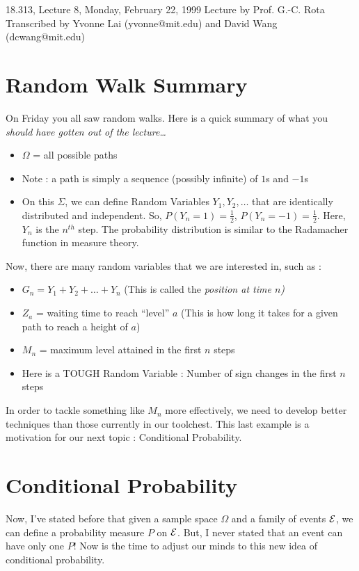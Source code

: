 {\Large 18.313, Lecture 8, Monday, February 22, 1999}\newline
{\large Lecture by Prof. G.-C. Rota}\\
Transcribed by Yvonne Lai (yvonne@mit.edu) and David Wang (dcwang@mit.edu)\\

\section{Random Walk Summary}
On Friday you all saw random walks.  Here is a quick summary of what you \em should \em have gotten out of the lecture\ldots
\begin{itemize}
\item[] $\Omega$ = all possible paths
\item[] Note : a path is simply a sequence (possibly infinite) of $1$s and $-1$s
\item[] On this $\Sigma$, we can define Random Variables $Y_1, Y_2, \ldots$ that are identically distributed and independent.  So, $P(Y_n = 1) = \frac{1}{2}$, $P(Y_n = -1) = \frac{1}{2}$.  Here, $Y_n$ is the $n^{th}$ step.  The probability distribution is similar to the Radamacher function in measure theory.
\end{itemize}
Now, there are many random variables that we are interested in, such as : 
\begin{itemize}
\item $G_n = Y_1 + Y_2 + \ldots + Y_n$ (This is called the \em position \em at time $n$)
\item $ Z_a$ = waiting time to reach ``level'' $a$ (This is how long it takes for a given path to reach a height of $a$)
\item $M_n$ = maximum level attained in the first $n$ steps
\item[] Here is a TOUGH Random Variable : Number of sign changes in the first $n$ steps
\end{itemize}
In order to tackle something like $M_n$ more effectively, we need to develop better techniques than those currently in our toolchest.  This last example is a motivation for our next topic : Conditional Probability.

\section{Conditional Probability}
Now, I've stated before that given a sample space $\Omega$ and a family of events $\cal{E}$, we can define a probability measure $P$ on $\cal{E}$.  But, I never stated that an event can have only one $P$!  Now is the time to adjust our minds to this new idea of conditional probability.

